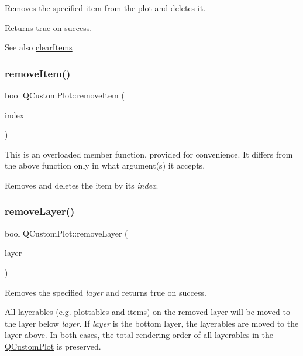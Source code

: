 Removes the specified item from the plot and deletes it.

Returns true on success.

\begin{DoxySeeAlso}{See also}
\mbox{\hyperlink{class_q_custom_plot_abdfd07d4f0591d0cf967f85013fd3645}{clear\+Items}} 
\end{DoxySeeAlso}
\mbox{\label{class_q_custom_plot_abcfdda3d601c0441cab136137d715dea}} 
\subsubsection{\texorpdfstring{remove\+Item()}{removeItem()}\hspace{0.1cm}{\footnotesize\ttfamily [2/2]}}
{\footnotesize\ttfamily bool Q\+Custom\+Plot\+::remove\+Item (\begin{DoxyParamCaption}\item[{int}]{index }\end{DoxyParamCaption})}

This is an overloaded member function, provided for convenience. It differs from the above function only in what argument(s) it accepts.

Removes and deletes the item by its {\itshape index}. \mbox{\label{class_q_custom_plot_a40f75e342c5eaab6a86066a42a0e2a94}} 
\subsubsection{\texorpdfstring{remove\+Layer()}{removeLayer()}}
{\footnotesize\ttfamily bool Q\+Custom\+Plot\+::remove\+Layer (\begin{DoxyParamCaption}\item[{\mbox{\hyperlink{class_q_c_p_layer}{Q\+C\+P\+Layer}} $\ast$}]{layer }\end{DoxyParamCaption})}

Removes the specified {\itshape layer} and returns true on success.

All layerables (e.\+g. plottables and items) on the removed layer will be moved to the layer below {\itshape layer}. If {\itshape layer} is the bottom layer, the layerables are moved to the layer above. In both cases, the total rendering order of all layerables in the \mbox{\hyperlink{class_q_custom_plot}{Q\+Custom\+Plot}} is preserved.

